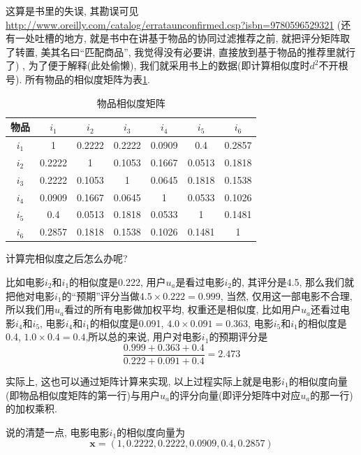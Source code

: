 \documentclass[a4paper,UTF8]{ctexart}
\theoremstyle{plain} \newtheorem{theorem}{定理}[section]
\theoremstyle{plain} \newtheorem{definition}{定义}[section]
\theoremstyle{plain} \newtheorem{lemma}{引理}[section]
\theoremstyle{plain} \newtheorem{proposition}{命题}[section]
\theoremstyle{plain} \newtheorem{example}{例}[section]
\theoremstyle{plain} \newtheorem{remark}{注}[section]
\theoremstyle{plain} \newtheorem{corollary}{推论}[section]
\begin{document}
这算是书里的失误, 其勘误可见\url{http://www.oreilly.com/catalog/errataunconfirmed.csp?isbn=9780596529321} (还有一处吐槽的地方, 就是书中在讲基于物品的协同过滤推荐之前, 就把评分矩阵取了转置, 美其名曰“匹配商品”, 我觉得没有必要讲, 直接放到基于物品的推荐里就行了) , 为了便于解释(此处偷懒), 我们就采用书上的数据(即计算相似度时$d^2$不开根号). 所有物品的相似度矩阵为表\ref{simitem}.
\begin{table}[!htb]
\centering
\caption{物品相似度矩阵}
\label{simitem}
\begin{tabular}{c|c|c|c|c|c|c}
	\hline
    物品 & $i_1$ & $i_2$ & $i_3$ & $i_4$ & $i_5$ & $i_6$ \\ 
    \hline
	$i_1$ & 1 & 0.2222 & 0.2222 & 0.0909 & 0.4 & 0.2857 \\ 
	\hline
	$i_2$ & 0.2222 & 1 & 0.1053 & 0.1667 & 0.0513 & 0.1818 \\ 
	\hline
	$i_3$ & 0.2222 & 0.1053 & 1 & 0.0645 & 0.1818 & 0.1538 \\ 
	\hline
	$i_4$ & 0.0909 & 0.1667 & 0.0645 & 1 & 0.0533 & 0.1026 \\
	\hline
	$i_5$ & 0.4 & 0.0513 & 0.1818 & 0.0533 & 1 & 0.1481 \\ 
	\hline
	$i_6$ & 0.2857 & 0.1818 & 0.1538 & 0.1026 & 0.1481 & 1 \\ 
	\hline
\end{tabular}
\end{table}

计算完相似度之后怎么办呢?

比如电影$i_2$和$i_1$的相似度是0.222, 用户$u_a$是看过电影$i_2$的, 其评分是4.5, 那么我们就把他对电影$i_1$的“预期”评分当做$4.5 \times 0.222 = 0.999$, 当然, 仅用这一部电影不合理, 所以我们用$u_a$看过的所有电影做加权平均, 权重还是相似度, 比如用户$u_a$还看过电影$i_4$和$i_5$, 电影$i_4$和$i_1$的相似度是0.091, $4.0 \times 0.091 = 0.363$, 电影$i_5$和$i_1$的相似度是0.4, $1.0 \times 0.4 = 0.4$,所以总的来说, 用户对电影$i_1$的预期评分是
\begin{equation*}
\frac{0.999 + 0.363 + 0.4}{0.222 + 0.091 + 0.4} = 2.473
\end{equation*}

实际上, 这也可以通过矩阵计算来实现, 以上过程实际上就是电影$i_1$的相似度向量(即物品相似度矩阵的第一行)与用户$u_a$的评分向量(即评分矩阵中对应$u_a$的那一行)的加权乘积.

说的清楚一点, 电影电影$i_1$的相似度向量为
\begin{equation*}
\bm{x} = (1, 0.2222, 0.2222, 0.0909, 0.4, 0.2857)
\end{equation*}
\end{document}
